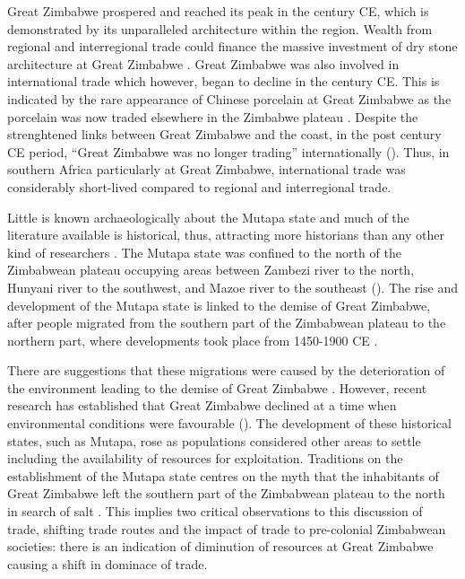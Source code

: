 Great Zimbabwe prospered and reached its peak in the  century CE, which is demonstrated by its unparalleled architecture within the region. Wealth from regional and interregional trade could finance the massive investment of dry stone architecture at Great Zimbabwe \parencite{kim2008}.
Great Zimbabwe was also involved in international trade which however, began to decline in the  century CE. This is indicated by the rare appearance of Chinese porcelain at Great Zimbabwe as the porcelain was now traded elsewhere in the Zimbabwe plateau \parencite{pikirayi2006}.
Despite the strenghtened links between Great Zimbabwe and the coast, in the post  century CE period, \enquote{Great Zimbabwe was no longer trading} internationally (\cite[][135]{garlake1973}). Thus, in southern Africa particularly at Great Zimbabwe, international trade was considerably short-lived compared to regional and interregional trade.

Little is known archaeologically about the Mutapa state and much of the literature available is historical, thus, attracting more historians than any other kind of researchers \parencite{pikirayi1993}.
The Mutapa state was confined to the north of the Zimbabwean plateau occupying areas between Zambezi river to the north, Hunyani river to the southwest, and Mazoe river to the southeast (\cite[][1]{beach1976}).
The rise and development of the Mutapa state is linked to the demise of Great Zimbabwe, after people migrated from the southern part of the Zimbabwean plateau to the northern part, where developments took place from 1450-1900 CE \parencite{pikirayi2006}.

There are suggestions that these migrations were caused by the deterioration of the environment leading to the demise of Great Zimbabwe \parencite{huffman1972}. However, recent research has established that Great Zimbabwe declined at a time when environmental conditions were favourable (\cites{pikirayi2001}{pikirayi2006}{pikirayi2017}{chirikure2017}).
The development of these historical states, such as Mutapa, rose as populations considered other areas to settle including the availability of resources for exploitation. Traditions on the establishment of the Mutapa state centres on the myth that the inhabitants of Great Zimbabwe left the southern part of the Zimbabwean plateau to the north in search of salt \parencite{ab1961}.
This implies two critical observations to this discussion of trade, shifting trade routes and the impact of trade to pre-colonial Zimbabwean societies:
there is an indication of diminution of resources at Great Zimbabwe causing a shift in dominace of trade.

